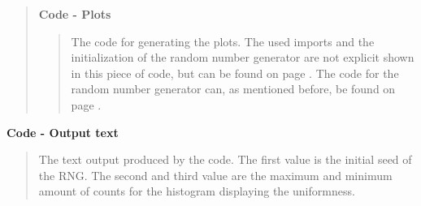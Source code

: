 \begin{quote}
\textbf{Code - Plots}



\begin{quote}
The code for generating the plots. The used imports and the initialization of the random number generator are not explicit shown in this piece of code, but can be found on page \pageref{CODE:MAIN1}. The code for the random number generator can, as mentioned before, be found on page \pageref{CODE:RNG}.


\end{quote}
\end{quote}

\textbf{Code - Output text } 
\begin{quote}
The text output produced by the code. The first value is the initial seed of the RNG. The second and third value are the maximum and minimum amount of counts for the histogram displaying the uniformness.

\end{quote}
\newpage

